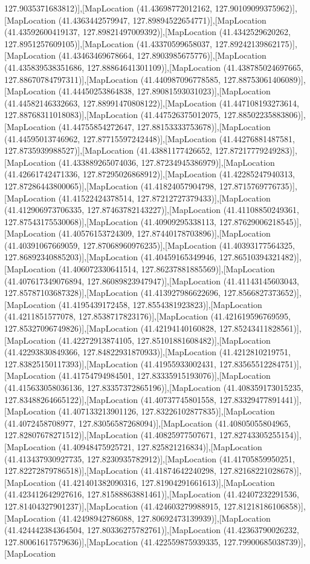 127.9035371683812)],[MapLocation (41.43698772012162, 127.90109099375962)],[MapLocation (41.4363442579947, 127.89894522654771)],[MapLocation (41.43592600419137, 127.89821497009392)],[MapLocation (41.4342529620262, 127.8951257609105)],[MapLocation (41.43370599658037, 127.89242139862175)],[MapLocation (41.43463469678664, 127.8903985675776)],[MapLocation (41.435839538351686, 127.88864641301109)],[MapLocation (41.438785024697665, 127.88670784797311)],[MapLocation (41.440987096778585, 127.88753061406089)],[MapLocation (41.44450253864838, 127.89081593031023)],[MapLocation (41.44582146332663, 127.88991470808122)],[MapLocation (41.447108193273614, 127.88768311018083)],[MapLocation (41.447526375012075, 127.88502235883806)],[MapLocation (41.44755854272647, 127.88153333753678)],[MapLocation (41.44595013746962, 127.87715597242448)],[MapLocation (41.44276881487581, 127.8735939988527)],[MapLocation (41.43881177426652, 127.87217779249283)],[MapLocation (41.433889265074036, 127.87234945386979)],[MapLocation (41.42661742471336, 127.87295026868912)],[MapLocation (41.42285247940313, 127.87286443800065)],[MapLocation (41.41824057904798, 127.8715769776735)],[MapLocation (41.41522424378514, 127.87212727379433)],[MapLocation (41.412906973706335, 127.87463782143227)],[MapLocation (41.41108850249361, 127.87543175530068)],[MapLocation (41.40909295338113, 127.87629006218545)],[MapLocation (41.40576153724309, 127.87440178703896)],[MapLocation (41.40391067669059, 127.87068960976235)],[MapLocation (41.40393177564325, 127.86892340885203)],[MapLocation (41.40459165349946, 127.86510394321482)],[MapLocation (41.406072330641514, 127.86237881885569)],[MapLocation (41.407617349076894, 127.86089823947947)],[MapLocation (41.41143145603043, 127.85787103687328)],[MapLocation (41.413927986622696, 127.8566827373652)],[MapLocation (41.4195439172458, 127.8554381923823)],[MapLocation (41.4211851577078, 127.8538717823176)],[MapLocation (41.421619596769595, 127.85327096749826)],[MapLocation (41.42194140160828, 127.85243411828561)],[MapLocation (41.42272913874105, 127.85101881608482)],[MapLocation (41.42293830849366, 127.84822931870933)],[MapLocation (41.4212810219751, 127.83825150117393)],[MapLocation (41.41955933002431, 127.83565512284751)],[MapLocation (41.41754794984501, 127.83335915193076)],[MapLocation (41.415633058036136, 127.83357372865196)],[MapLocation (41.408359173015235, 127.83488264665122)],[MapLocation (41.40737745801558, 127.83329477891441)],[MapLocation (41.407133213901126, 127.83226102877835)],[MapLocation (41.4072458708977, 127.83056587268094)],[MapLocation (41.40805055804965, 127.82807678271512)],[MapLocation (41.40825977507671, 127.82743305255154)],[MapLocation (41.40948475925721, 127.825821216834)],[MapLocation (41.413437930927735, 127.8230935782912)],[MapLocation (41.41705859950251, 127.82272879786518)],[MapLocation (41.41874642240298, 127.82168221028678)],[MapLocation (41.421401382090316, 127.81904291661613)],[MapLocation (41.423412642927616, 127.81588863881461)],[MapLocation (41.42407232291536, 127.81404327901237)],[MapLocation (41.424603279988915, 127.81218186106858)],[MapLocation (41.42498942786088, 127.80692473139939)],[MapLocation (41.424442384364504, 127.80336275782761)],[MapLocation (41.42363790026232, 127.80061617579636)],[MapLocation (41.422559875939335, 127.79900685038739)],[MapLocation 